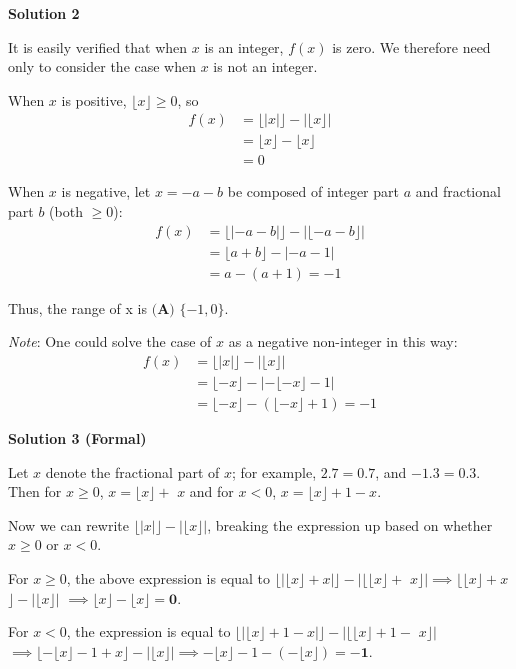 \begin{enumerate}
\textbf{Solution 2}

It is easily verified that when $x$ is an integer, $f(x)$ is zero. We therefore need only to consider the case when $x$ is not an integer.

 When $x$ is positive, $\lfloor x\rfloor \geq 0$, so 
 \[\begin{split}f(x)&=\lfloor|x|\rfloor-|\lfloor x\rfloor| \\ &=\lfloor x\rfloor-\lfloor x\rfloor \\ &=0\end{split}\]

 When $x$ is negative, let $x=-a-b$ be composed of integer part $a$ and fractional part $b$ (both $\geq 0$):
 \[\begin{split}f(x)&=\lfloor|-a-b|\rfloor-|\lfloor -a-b\rfloor| \\ &=\lfloor a+b\rfloor-|-a-1| \\ &=a-(a+1)=-1\end{split}\]

 Thus, the range of x is $\boxed{\textbf{(A) } \{-1, 0\}}$.

 \textit{Note}: One could solve the case of $x$ as a negative non-integer in this way:
 \[\begin{split}f(x)&=\lfloor|x|\rfloor-|\lfloor x\rfloor| \\ &=\lfloor -x\rfloor-|-\lfloor -x\rfloor-1| \\ &=\lfloor -x\rfloor-(\lfloor -x\rfloor+1) = -1\end{split}\]




\textbf{Solution 3 (Formal)}

Let {$x$} denote the fractional part of $x$; for example, {$2.7$}$= 0.7$, and {$-1.3$}$= 0.3$. Then for $x \geq 0$, $x = \lfloor x \rfloor +$ {$x$} and for $x < 0$, $x = \lfloor x \rfloor + 1 -${$x$}.

 Now we can rewrite $\lfloor |x| \rfloor - |\lfloor x \rfloor|$, breaking the expression up based on whether $x \geq 0$ or $x < 0$.

 For $x \geq 0$, the above expression is equal to $\lfloor |\lfloor x \rfloor +${$x$}$| \rfloor - | \lfloor \lfloor x \rfloor +$ {$x$}$\rfloor | \implies \lfloor \lfloor x \rfloor +${$x$}$\rfloor - | \lfloor x \rfloor |$
$\implies \lfloor x \rfloor - \lfloor x \rfloor = \mathbf{0}$.

 For $x < 0$, the expression is equal to $\lfloor |\lfloor x \rfloor + 1 -${$x$}$| \rfloor - | \lfloor \lfloor x \rfloor + 1 -$ {$x$}$\rfloor |$
$\implies \lfloor - \lfloor x \rfloor - 1 +${$x$}$\rfloor - | \lfloor x \rfloor | \implies - \lfloor x \rfloor  - 1 - (- \lfloor x \rfloor) = \mathbf{-1}$.


\end{enumerate}

